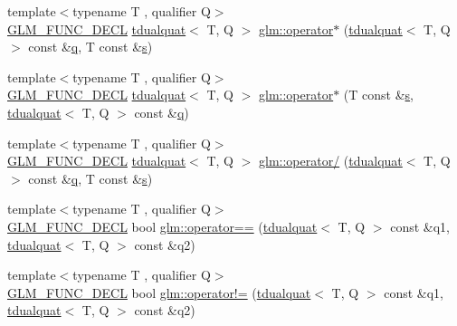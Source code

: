 \begin{DoxyCompactItemize}
\item 
{\footnotesize template$<$typename T , qualifier Q$>$ }\\\hyperlink{setup_8hpp_ab2d052de21a70539923e9bcbf6e83a51}{G\+L\+M\+\_\+\+F\+U\+N\+C\+\_\+\+D\+E\+CL} \hyperlink{structglm_1_1tdualquat}{tdualquat}$<$ T, Q $>$ \hyperlink{group__gtx__dual__quaternion_ga03c35eae969f074f10fa2bf473670ad7}{glm\+::operator$\ast$} (\hyperlink{structglm_1_1tdualquat}{tdualquat}$<$ T, Q $>$ const \&\hyperlink{_s_d_l__opengl_8h_a8fc1e7b9baaae687804c7eed46ca09c6}{q}, T const \&\hyperlink{_s_d_l__opengl_8h_a4af680a6c683f88ed67b76f207f2e6e4}{s})
\item 
{\footnotesize template$<$typename T , qualifier Q$>$ }\\\hyperlink{setup_8hpp_ab2d052de21a70539923e9bcbf6e83a51}{G\+L\+M\+\_\+\+F\+U\+N\+C\+\_\+\+D\+E\+CL} \hyperlink{structglm_1_1tdualquat}{tdualquat}$<$ T, Q $>$ \hyperlink{group__gtx__dual__quaternion_gafbd543470cb70432624e046ab85a00e4}{glm\+::operator$\ast$} (T const \&\hyperlink{_s_d_l__opengl_8h_a4af680a6c683f88ed67b76f207f2e6e4}{s}, \hyperlink{structglm_1_1tdualquat}{tdualquat}$<$ T, Q $>$ const \&\hyperlink{_s_d_l__opengl_8h_a8fc1e7b9baaae687804c7eed46ca09c6}{q})
\item 
{\footnotesize template$<$typename T , qualifier Q$>$ }\\\hyperlink{setup_8hpp_ab2d052de21a70539923e9bcbf6e83a51}{G\+L\+M\+\_\+\+F\+U\+N\+C\+\_\+\+D\+E\+CL} \hyperlink{structglm_1_1tdualquat}{tdualquat}$<$ T, Q $>$ \hyperlink{group__gtx__dual__quaternion_gaac31fa68a57186cd22388eb385ca115d}{glm\+::operator/} (\hyperlink{structglm_1_1tdualquat}{tdualquat}$<$ T, Q $>$ const \&\hyperlink{_s_d_l__opengl_8h_a8fc1e7b9baaae687804c7eed46ca09c6}{q}, T const \&\hyperlink{_s_d_l__opengl_8h_a4af680a6c683f88ed67b76f207f2e6e4}{s})
\item 
{\footnotesize template$<$typename T , qualifier Q$>$ }\\\hyperlink{setup_8hpp_ab2d052de21a70539923e9bcbf6e83a51}{G\+L\+M\+\_\+\+F\+U\+N\+C\+\_\+\+D\+E\+CL} bool \hyperlink{group__gtx__dual__quaternion_ga82faf668287e9ca3c9751d873a85970d}{glm\+::operator==} (\hyperlink{structglm_1_1tdualquat}{tdualquat}$<$ T, Q $>$ const \&q1, \hyperlink{structglm_1_1tdualquat}{tdualquat}$<$ T, Q $>$ const \&q2)
\item 
{\footnotesize template$<$typename T , qualifier Q$>$ }\\\hyperlink{setup_8hpp_ab2d052de21a70539923e9bcbf6e83a51}{G\+L\+M\+\_\+\+F\+U\+N\+C\+\_\+\+D\+E\+CL} bool \hyperlink{group__gtx__dual__quaternion_ga41964adca31c6e6b52f1367104d15646}{glm\+::operator!=} (\hyperlink{structglm_1_1tdualquat}{tdualquat}$<$ T, Q $>$ const \&q1, \hyperlink{structglm_1_1tdualquat}{tdualquat}$<$ T, Q $>$ const \&q2)

\end{DoxyCompactItemize}

